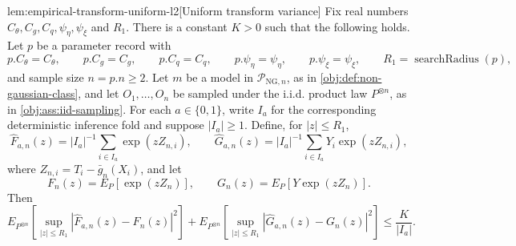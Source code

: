 \documentclass[11pt]{article}
\begin{document}
\begin{lemmav}{lem:empirical-transform-uniform-l2}[Uniform transform variance]
Fix real numbers \(C_{\theta},C_g,C_q,\psi_{\eta},\psi_{\xi}\) and \(R_1\). There is a constant \(K>0\) such that the following holds. Let \(p\) be a parameter record with
\[
p.C_{\theta}=C_{\theta},\qquad
p.C_g=C_g,\qquad
p.C_q=C_q,\qquad
p.\psi_{\eta}=\psi_{\eta},\qquad
p.\psi_{\xi}=\psi_{\xi},\qquad
R_1=\operatorname{searchRadius}(p),
\]
and sample size \(n=p.n\ge2\). Let \(m\) be a model in \(\mathcal P_{\mathrm{NG},n}\), as in \cref{obj:def:non-gaussian-class}, and let \(O_1,\ldots,O_n\) be sampled under the i.i.d. product law \(P^{\otimes n}\), as in \cref{obj:ass:iid-sampling}. For each \(a\in\{0,1\}\), write \(I_a\) for the corresponding deterministic inference fold and suppose \(|I_a|\ge1\). Define, for \(|z|\le R_1\),
\[
\widehat F_{a,n}(z)=|I_a|^{-1}\sum_{i\in I_a}\exp(zZ_{n,i}),
\qquad
\widehat G_{a,n}(z)=|I_a|^{-1}\sum_{i\in I_a}Y_i\exp(zZ_{n,i}),
\]
where \(Z_{n,i}=T_i-\bar g_n(X_i)\), and let
\[
F_n(z)=E_P[\exp(zZ_n)],
\qquad
G_n(z)=E_P[Y\exp(zZ_n)].
\]
Then
\[
E_{P^{\otimes n}}\!\left[\sup_{|z|\le R_1}
|\widehat F_{a,n}(z)-F_n(z)|^2\right]
+
E_{P^{\otimes n}}\!\left[\sup_{|z|\le R_1}
|\widehat G_{a,n}(z)-G_n(z)|^2\right]
\le
\frac{K}{|I_a|}.
\]
\end{lemmav}
\end{document}
